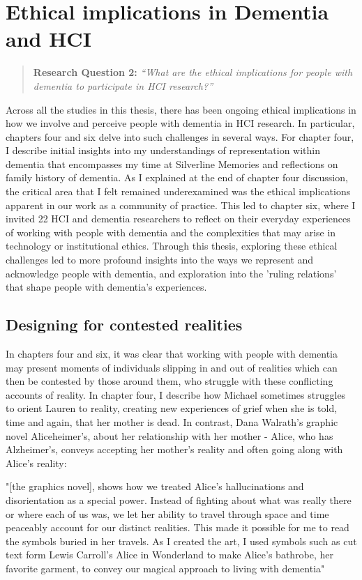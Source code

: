 \section{Ethical implications in Dementia and HCI}
\label{Discussion:RQ2}
\begin{quote}
\textbf{    Research Question 2:
}    
\textit{    “What are the ethical implications for people with dementia to participate in HCI research?”}
\end{quote}
Across all the studies in this thesis, there has been ongoing ethical implications in how we involve and perceive people with dementia in HCI research. In particular, chapters four and six delve into such challenges in several ways. For chapter four,  I describe initial insights into my understandings of representation within dementia that encompasses my time at Silverline Memories and reflections on family history of dementia. As I explained at the end of chapter four discussion, the critical area that I felt remained underexamined was the ethical implications apparent in our work as a community of practice. This led to chapter six, where I invited 22 HCI and dementia researchers to reflect on their everyday experiences of working with people with dementia and the complexities that may arise in technology or institutional ethics. Through this thesis, exploring these ethical challenges led to more profound insights into the ways we represent and acknowledge people with dementia, and exploration into the 'ruling relations' that shape people with dementia's experiences. 

\subsection{Designing for contested realities}
\label{RQ2:ContestedRealities}
In chapters four and six, it was clear that working with people with dementia may present moments of individuals slipping in and out of realities which can then be contested by those around them, who struggle with these conflicting accounts of reality. In chapter four, I describe how Michael sometimes struggles to orient Lauren to reality, creating new experiences of grief when she is told, time and again, that her mother is dead. In contrast, Dana Walrath's graphic novel Aliceheimer's, about her relationship with her mother - Alice, who has Alzheimer's, conveys accepting her mother's reality and often going along with Alice's reality:

"[the graphics novel], shows how we treated Alice's hallucinations and disorientation as a special power. Instead of fighting about what was really there or where each of us was, we let her ability to travel through space and time peaceably account for our distinct realities. This made it possible for me to read the symbols buried in her travels. As I created the art, I used symbols such as cut text form Lewis Carroll's Alice in Wonderland to make Alice's bathrobe, her favorite garment, to convey our magical approach to living with dementia"

